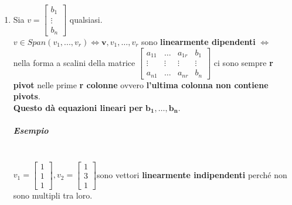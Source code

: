 \documentclass[a4paper, 12pt]{report}
\begin{document}
\begin{enumerate}
                        \item Sia
                            $
                            v=
                            \begin{bmatrix}
                                b_1\\
                                \vdots\\
                                b_n
                            \end{bmatrix}
                            $ qualsiasi.\\
                            $v \in Span(v_1,...,v_r) \Leftrightarrow \boldsymbol{v},v_1,\dots,v_r$ sono \textbf{linearmente dipendenti} $\Leftrightarrow$\\
                            nella forma a scalini della matrice 
                            $
                            \begin{bmatrix}
                                a_{11} & \dots & a_{1r} & b_1\\
                                \vdots & \vdots & \vdots & \vdots\\
                                a_{n1} & \dots & a_{nr} & b_n
                            \end{bmatrix}
                            $
                            ci sono sempre \textbf{r pivot} nelle prime \textbf{r colonne} ovvero \textbf{l'ultima colonna non contiene pivots}.\\
                            \textbf{Questo dà equazioni lineari per} $\boldsymbol{b_1,\dots,b_n}$.
                            \subparagraph{Esempio}\mbox{}\\
                            $
                            v_1=
                            \begin{bmatrix}
                                1\\
                                1\\
                                1
                            \end{bmatrix}
                            , v_2=
                            \begin{bmatrix}
                                1\\
                                3\\
                                1
                            \end{bmatrix}
                            $sono vettori \textbf{linearmente indipendenti} perché non sono multipli tra loro.

\end{enumerate}
\end{document}

